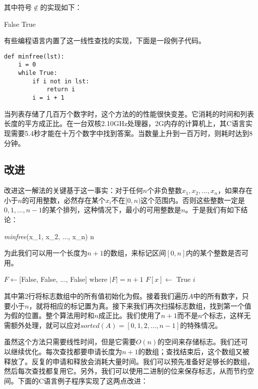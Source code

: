 \documentclass[b5paper]{ctexart}
\begin{document}
其中符号$\notin$的实现如下：

\begin{algorithmic}[1]
      \State \Return False
    \EndIf
  \EndFor
  \State \Return True
\EndFunction
\end{algorithmic}

有些编程语言内置了这一线性查找的实现，下面是一段例子代码。

\lstset{language=Python, frame=single}
\begin{lstlisting}
def minfree(lst):
    i = 0
    while True:
        if i not in lst:
            return i
        i = i + 1
\end{lstlisting}

当列表存储了几百万个数字时，这个方法的的性能很快变差。它消耗的时间和列表长度的平方成正比。在一台双核2.10GHz处理器，2G内存的计算机上，其C语言实现需要5.4秒才能在十万个数字中找到答案。当数量上升到一百万时，则耗时达到8分钟。

\subsection*{改进}
改进这一解法的关键基于这一事实：对于任何$n$个非负整数$x_1, x_2, ..., x_n$，如果存在小于$n$的可用整数，必然存在某个$x_i$不在$[0, n)$这个范围内。否则这些整数一定是$0, 1, ..., n - 1$的某个排列，这种情况下，最小的可用整数是$n$。于是我们有如下结论：

\be
\textit{minfree}(x_1, x_2, ..., x_n) \leq n
\label{eq:min-free}
\ee

为此我们可以用一个长度为$n + 1$的数组，来标记区间$[0, n]$内的某个整数是否可用。

\begin{algorithmic}[1]
  \State $F \gets $[False, False, ..., False] where $|F| = n+1$
      \State $F[x] \gets$ True
    \EndIf
  \EndFor
      \State \Return $i$
    \EndIf
  \EndFor
\EndFunction
\end{algorithmic}

其中第2行将标志数组中的所有值初始化为假。接着我们遍历$A$中的所有数字，只要小于$n$，就将相应的标记置为真。接下来我们再次扫描标志数组，找到第一个值为假的位置。整个算法用时和$n$成正比。我们使用了$n + 1$而不是$n$个标志，这样无需额外处理，就可以应对$sorted(A) = [0, 1, 2, ..., n-1]$的特殊情况。

虽然这个方法只需要线性时间，但是它需要$O(n)$的空间来存储标志。我们还可以继续优化。每次查找都要申请长度为$n + 1$的数组；查找结束后，这个数组又被释放了。反复的申请和释放会消耗大量时间。我们可以预先准备好足够长的数组，然后每次查找都复用它。另外，我们可以使用二进制的位来保存标志，从而节约空间。下面的C语言例子程序实现了这两点改进：
\end{document}

